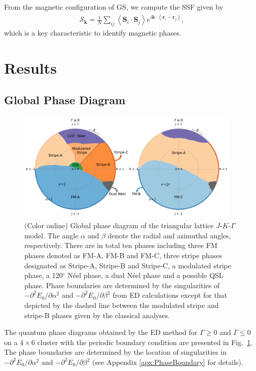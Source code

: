 \documentclass[aps,prb,reprint,amsfonts,amsmath,amssymb,showpacs,groupedaddress,superscriptaddress]{revtex4-1}
\begin{document}
From the magnetic configuration of GS, we compute the SSF given by
\begin{align}
    \mathcal{S}_{\bm{k}} = \frac{1}{N} \sum_{ij} \left \langle \bm{S}_i \cdot \bm{S}_j \right \rangle e^{i \bm{k} \cdot (\bm{r}_i-\bm{r}_j)},
\end{align}
which is a key characteristic to identify magnetic phases.

\section{\label{sec:Results}Results}

\subsection{\label{subsec:GlobalPhaseDiagram}Global Phase Diagram}

\begin{figure}
    \centering
    \includegraphics[width=0.95\textwidth]{fig/QuantumGlobalPhaseDiagram.pdf}
    \caption{\label{fig:QuantumPhaseDiagram}(Color online) Global phase diagram of the triangular lattice $J$-$K$-$\Gamma$ model. The angle $\alpha$ and $\beta$ denote the radial and azimuthal angles, respectively. There are in total ten phases including three FM phases denoted as FM-A, FM-B and FM-C, three stripe phases designated as Stripe-A, Stripe-B and Stripe-C, a modulated stripe phase, a 120$^\circ$ N\'{e}el phase, a dual N\'{e}el phase and a possible QSL phase. Phase boundaries are determined by the singularities of $-\partial^2E_0/\partial\alpha^2$ and $-\partial^2E_0/\partial\beta^2$ from ED calculations except for that depicted by the dashed line between the modulated stripe and stripe-B phases given by the classical analyses.}
\end{figure}

The quantum phase diagrams obtained by the ED method for $\Gamma \geq 0$ and $\Gamma \leq 0$ on a $4 \times 6$ cluster with the periodic boundary condition are presented in Fig.~\ref{fig:QuantumPhaseDiagram}. The phase boundaries are determined by the location of singularities in $-\partial^2E_0/\partial\alpha^2$ and $-\partial^2E_0/\partial\beta^2$ (see Appendix \ref{apx:PhaseBoundary} for details).
\end{document}
